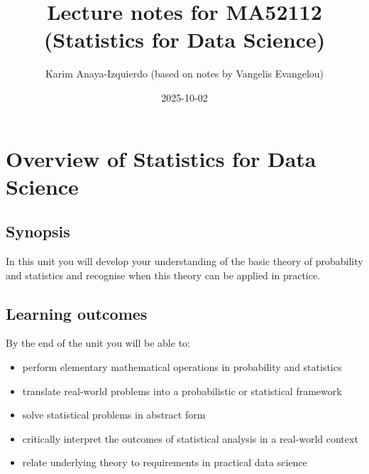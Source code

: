 \documentclass[
  letterpaper,
  DIV=11,
  numbers=noendperiod]{scrreport}
\title{Lecture notes for MA52112 (Statistics for Data Science)}
\author{Karim Anaya-Izquierdo (based on notes by Vangelis Evangelou)}
\date{2025-10-02}
\renewcommand*\contentsname{Table of contents}
\newcommand\contentsname{Table of contents}
\theoremstyle{definition}
\theoremstyle{plain}
\theoremstyle{definition}
\theoremstyle{plain}
\theoremstyle{remark}
\begin{document}
\maketitle

\renewcommand*\contentsname{Table of contents}
{
\hypersetup{linkcolor=}
\setcounter{tocdepth}{2}
\tableofcontents
}


\chapter*{Overview of Statistics for Data
Science}\label{overview-of-statistics-for-data-science}


\section*{Synopsis}\label{synopsis}


In this unit you will develop your understanding of the basic theory of
probability and statistics and recognise when this theory can be applied
in practice.

\section*{Learning outcomes}\label{learning-outcomes}


By the end of the unit you will be able to:

\begin{itemize}
\item
  perform elementary mathematical operations in probability and
  statistics
\item
  translate real-world problems into a probabilistic or statistical
  framework
\item
  solve statistical problems in abstract form
\item
  critically interpret the outcomes of statistical analysis in a
  real-world context
\item
  relate underlying theory to requirements in practical data science
\end{itemize}
\end{document}
